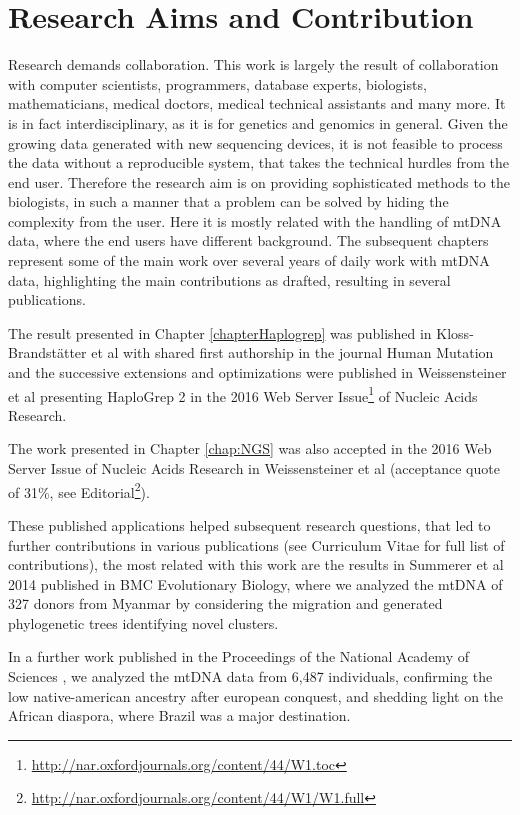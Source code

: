 \section{Research Aims and Contribution}
Research demands collaboration. This work is largely the result of collaboration with computer scientists, programmers, database experts, biologists, mathematicians, medical doctors, medical technical assistants and many more. It is in fact interdisciplinary, as it is for genetics and genomics in general. Given the growing data generated with new sequencing devices, it is not feasible to process the data without a reproducible system, that takes the technical hurdles from the end user. Therefore the research aim is on providing sophisticated methods to the biologists, in such a manner that a problem can be solved by hiding the complexity from the user. Here it is mostly related with the handling of mtDNA data, where the end users have different background. The subsequent chapters represent some of the main work over several years of daily work with mtDNA data, highlighting the main contributions as drafted, resulting in several publications. 

The result presented in Chapter \ref{chapterHaplogrep} was published in Kloss-Brandst\"atter et al with shared first authorship in the journal Human Mutation \cite{Kloss-Brandstatter2011} and the successive extensions and optimizations were published in Weissensteiner et al presenting HaploGrep 2 in the 2016 Web Server Issue\footnote{\url{http://nar.oxfordjournals.org/content/44/W1.toc}} of Nucleic Acids Research\cite{Weissensteiner2016a}.

The work presented in Chapter \ref{chap:NGS} was also accepted in the 2016 Web Server Issue of Nucleic Acids Research in Weissensteiner et al \cite{Weissensteiner2016b} (acceptance quote of 31\%, see Editorial\footnote{\url{http://nar.oxfordjournals.org/content/44/W1/W1.full}}).

These published applications helped subsequent research questions, that led to further contributions in various publications (see Curriculum Vitae for full list of contributions), the most related with this work are the results in Summerer et al 2014 published in BMC Evolutionary Biology, \cite{Summerer2014} where we analyzed the mtDNA of 327 donors from Myanmar by considering the migration and generated phylogenetic trees identifying novel clusters. 

In a further work published in the Proceedings of the National Academy of Sciences \cite{Kehdy2015}, we analyzed the mtDNA data from 6,487 individuals, confirming the low native-american ancestry after european conquest, and shedding light on the African diaspora, where Brazil was a major destination.

